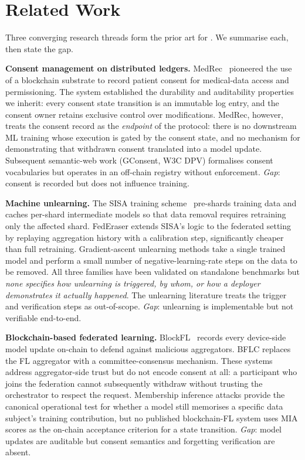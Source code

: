 \section{Related Work}
\label{sec:related}

Three converging research threads form the prior art for \sysname.
We summarise each, then state the gap.

\smallskip
\noindent\textbf{Consent management on distributed ledgers.}
MedRec~\cite{azaria2016medrec} pioneered the use of a blockchain
substrate to record patient consent for medical-data access and
permissioning. The system established the durability and auditability
properties we inherit: every consent state transition is an immutable
log entry, and the consent owner retains exclusive control over
modifications. MedRec, however, treats the consent record as the
\emph{endpoint} of the protocol: there is no downstream ML training
whose execution is gated by the consent state, and no mechanism for
demonstrating that withdrawn consent translated into a model update.
Subsequent semantic-web work (GConsent, W3C DPV) formalises consent
vocabularies but operates in an off-chain registry without
enforcement.
\emph{Gap}: consent is recorded but does not influence training.

\smallskip
\noindent\textbf{Machine unlearning.}
The SISA training scheme~\cite{bourtoule2021sisa} pre-shards training
data and caches per-shard intermediate models so that data removal
requires retraining only the affected shard. FedEraser
\cite{liu2021federaser} extends SISA's logic to the federated setting
by replaying aggregation history with a calibration step,
significantly cheaper than full retraining. Gradient-ascent unlearning methods take a single trained model and
perform a small number of negative-learning-rate steps on the data
to be removed. All three families have been validated on standalone
benchmarks but \emph{none specifies how unlearning is triggered, by
whom, or how a deployer demonstrates it actually happened}. The
unlearning literature treats the trigger and verification steps as
out-of-scope.
\emph{Gap}: unlearning is implementable but not verifiable
end-to-end.

\smallskip
\noindent\textbf{Blockchain-based federated learning.}
BlockFL~\cite{kim2020blockchained} records every device-side model
update on-chain to defend against malicious aggregators. BFLC
\cite{li2020bflc} replaces the FL aggregator with a committee-consensus
mechanism. These systems address aggregator-side trust but do not
encode consent at all: a participant who joins the federation
cannot subsequently withdraw without trusting the orchestrator to
respect the request. Membership inference attacks
\cite{shokri2017mia,carlini2022lira,choquettechoo2021labelonly} provide
the canonical operational test for whether a model still memorises a
specific data subject's training contribution, but no published
blockchain-FL system uses MIA scores as the on-chain acceptance
criterion for a state transition.
\emph{Gap}: model updates are auditable but consent semantics and
forgetting verification are absent.

